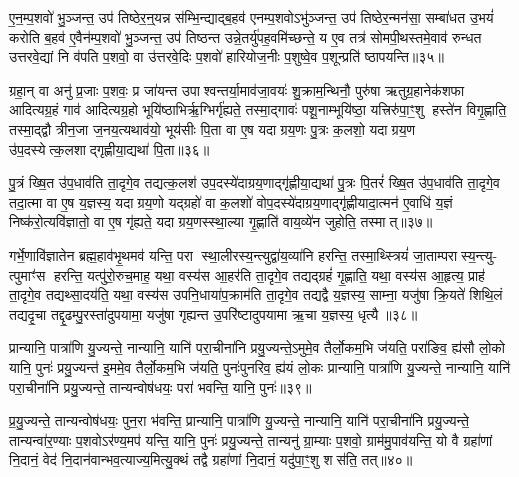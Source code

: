 ए॒न॒म्प॒शवो॑ भु॒ञ्जन्त॒ उप॑ तिष्ठेर॒न्॒यन्न स॑म्भि॒न्द्याद्ब॒हव॑ एनम्प॒शवोऽभु॑ञ्जन्त॒ उप॑ तिष्ठेर॒न्मन॑सा॒ सम्बा॑धत उ॒भयं॑ करोति ब॒हव॑ ए॒वैन॑म्प॒शवो॑ भु॒ञ्जन्त॒ उप॑ तिष्ठन्त उन्ने॒तर्यु॑पह॒वमि॑च्छन्ते॒ य ए॒व तत्र॑ सोमपी॒थस्तमे॒वाव॑ रुन्धत उत्तरवे॒द्यां नि व॑पति प॒शवो॒ वा उ॑त्तरवे॒दिः प॒शवो॑ हारियोज॒नीः प॒शुष्वे॒व प॒शून्प्रति॑ ष्ठापयन्ति॥३५॥

{\anuvakamend[{अ॒श्री॒णा॒द॒न्तरा॑धानाभ्या॒मल्पाः स्थापयन्ति॥९॥}]}

ग्रहा॒न् वा अनु॑ प्र॒जाः प॒शवः॒ प्र जा॑यन्त उपाश्वन्तर्या॒माव॑जा॒वयः॑ शु॒क्राम॒न्थिनौ॒ पुरु॑षा ऋतुग्र॒हानेक॑शफा आदित्यग्र॒हं गाव॑ आदित्यग्र॒हो भूयि॑ष्ठाभिर्\mbox{}ऋ॒ग्भिर्गृ॑ह्यते॒ तस्मा॒द्गावः॑ पशू॒नाम्भूयि॑ष्ठा॒ यत्त्रिरु॑पा॒ꣳ॒शु हस्ते॑न विगृ॒ह्णाति॒ तस्मा॒द्द्वौ त्रीन॒जा ज॒नय॒त्यथाव॑यो॒ भूय॑सीः पि॒ता वा ए॒ष यदाग्रय॒णः पु॒त्रः क॒लशो॒ यदाग्रय॒ण उ॑प॒दस्येत्क॒लशाद्गृह्णीया॒द्यथा॑ पि॒ता॥३६॥

पु॒त्रं ख्षि॒त उ॑प॒धाव॑ति ता॒दृगे॒व तद्यत्क॒लश॑ उप॒दस्ये॑दाग्रय॒णाद्गृ॑ह्णीया॒द्यथा॑ पु॒त्रः पि॒तरं॑ ख्षि॒त उ॑प॒धाव॑ति ता॒दृगे॒व तदा॒त्मा वा ए॒ष य॒ज्ञस्य॒ यदाग्रय॒णो यद्ग्रहो॑ वा क॒लशो॑ वोप॒दस्ये॑दाग्रय॒णाद्गृ॑ह्णीयादा॒त्मन॑ ए॒वाधि॑ य॒ज्ञं निष्क॑रो॒त्यवि॑ज्ञातो॒ वा ए॒ष गृ॑ह्यते॒ यदाग्रय॒णस्स्था॒ल्या गृ॒ह्णाति॑ वाय॒व्ये॑न जुहोति॒ तस्मात्॥३७॥

गर्भे॒णावि॑ज्ञातेन ब्रह्म॒हाव॑भृ॒थमव॑ यन्ति॒ परा स्था॒लीरस्य॒न्त्युद्वा॑य॒व्या॑नि हरन्ति॒ तस्मा॒थ्स्त्रियं॑ जा॒ताम्परास्य॒न्त्यु- त्पुमाꣳ॑स हरन्ति॒ यत्पु॑रो॒रुच॒माह॒ यथा॒ वस्य॑स आ॒हर॑ति ता॒दृगे॒व तद्यद्ग्रहं॑ गृ॒ह्णाति॒ यथा॒ वस्य॑स आ॒हृत्य॒ प्राह॑ ता॒दृगे॒व तद्यथ्सा॒दय॑ति॒ यथा॒ वस्य॑स उपनि॒धाया॑प॒क्राम॑ति ता॒दृगे॒व तद्यद्वै य॒ज्ञस्य॒ साम्ना॒ यजु॑षा क्रि॒यते॑ शिथि॒लं तद्यदृ॒चा तद्दृ॒ढम्पु॒रस्ता॑दुपयामा॒ यजु॑षा गृह्यन्त उ॒परि॑ष्टादुपयामा ऋ॒चा य॒ज्ञस्य॒ धृत्यै॥३८॥

{\anuvakamend[{यथा॑ पि॒ता तस्मा॑दप॒क्राम॑ति ता॒दृगे॒व तद्यद॒ष्टाद॑श च॥10॥}]}

प्रान्यानि॒ पात्रा॑णि यु॒ज्यन्ते॒ नान्यानि॒ यानि॑ परा॒चीना॑नि प्रयु॒ज्यन्ते॒ऽमुमे॒व तैर्लो॒कम॒भि ज॑यति॒ परा॑ङिव॒ ह्य॑सौ लो॒को यानि॒ पुनः॑ प्रयु॒ज्यन्त॑ इ॒ममे॒व तैर्लो॒कम॒भि ज॑यति॒ पुनः॑पुनरिव॒ ह्य॑यं लो॒कः प्रान्यानि॒ पात्रा॑णि यु॒ज्यन्ते॒ नान्यानि॒ यानि॑ परा॒चीना॑नि प्रयु॒ज्यन्ते॒ तान्यन्वोष॑धयः॒ परा॑ भवन्ति॒ यानि॒ पुनः॑॥३९॥

प्र॒यु॒ज्यन्ते॒ तान्यन्वोष॑धयः॒ पुन॒रा भ॑वन्ति॒ प्रान्यानि॒ पात्रा॑णि यु॒ज्यन्ते॒ नान्यानि॒ यानि॑ परा॒चीना॑नि प्रयु॒ज्यन्ते॒ तान्यन्वा॑र॒ण्याः प॒शवोऽर॑ण्य॒मप॑ यन्ति॒ यानि॒ पुनः॑ प्रयु॒ज्यन्ते॒ तान्यनु॑ ग्रा॒म्याः प॒शवो॒ ग्राम॑मु॒पाव॑यन्ति॒ यो वै ग्रहा॑णां नि॒दानं॒ वेद॑ नि॒दान॑वान्भव॒त्याज्य॒मित्यु॒क्थं तद्वै ग्रहा॑णां नि॒दानं॒ यदु॑पा॒ꣳ॒शु शस॑ति॒ तत्॥४०॥

